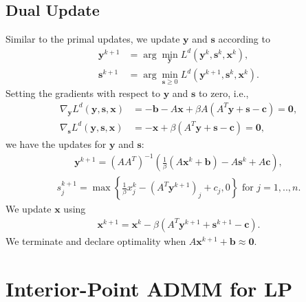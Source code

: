 \documentclass{article}
\begin{document}
\subsection*{Dual Update}
Similar to the primal updates, we update $\mathbf{y}$ and $\mathbf{s}$ according to 
\begin{align}
\mathbf{y}^{k+1} & = \arg \min_{\mathbf{y}} L^{d}(\mathbf{y}^{k},\mathbf{s}^k, \mathbf{x}^{k}),\\
\mathbf{s}^{k+1} & = \arg \min_{\mathbf{s} \geq 0} L^{d}(\mathbf{y}^{k+1},\mathbf{s}^k,\mathbf{x}^{k}).
\end{align}
Setting the gradients with respect to $\mathbf{y}$ and $\mathbf{s}$ to zero, i.e.,
\begin{align}
\nabla_{\mathbf{y}}L^{d}(\mathbf{y},\mathbf{s},\mathbf{x}) & =  -\mathbf{b}-A\mathbf{x}+\beta A\left(A^{T}\mathbf{y}+\mathbf{s}-\mathbf{c}\right)  = \mathbf{0}, \label{eq:dual_y} \\
\nabla_{\mathbf{s}}L^{d}(\mathbf{y},\mathbf{s},\mathbf{x}) & =  -\mathbf{x}+\beta\left(A^{T}\mathbf{y}+\mathbf{s}-\mathbf{c}\right) =  \mathbf{0},
\end{align}
we have the updates for $\mathbf{y}$ and $\mathbf{s}$:
\begin{align}\label{eq:y_dual_update}
\mathbf{y}^{k+1} = \left(AA^{T}\right)^{-1}\left(\frac{1}{\beta}\left(A\mathbf{x}^{k}+\mathbf{b}\right)-A\mathbf{s}^{k}+A\mathbf{c}\right),
\end{align}
\begin{align}\label{eq:s_dual_update}
s_j^{k+1} = \max\left\{ \frac{1}{\beta}{x}_j^k-(A^{T}\mathbf{y}^{k+1})_j+{c}_j,0\right\}  \text{ for $j = 1,..,n$}.
\end{align}
We update $\mathbf{x}$ using
\begin{align}\label{eq:x_dual_update}
\mathbf{x}^{k+1} = \mathbf{x}^k - \beta\left(A^T \mathbf{y}^{k+1} + \mathbf{s}^{k+1} - \mathbf{c}\right).
\end{align}
We terminate and declare optimality when $A \mathbf{x}^{k+1} + \mathbf{b} \approx \mathbf{0}$.


\vspace{0.5in}
\section{Interior-Point ADMM for LP}

\vspace{0.1in}
\end{document}
